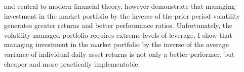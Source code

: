 and central to modern financial theory, however \citet{moreira_volatility-managed_2017} demonstrate that managing investment in the market portfolio by the inverse of the prior period volatility generates greater returns and better performance ratios. Unfortunately, the volatility managed portfolio requires extreme levels of leverage. I show that managing investment in the market portfolio by the inverse of the average variance of individual daily asset returns is not only a better performer, but cheaper and more practically implementable. %
 
